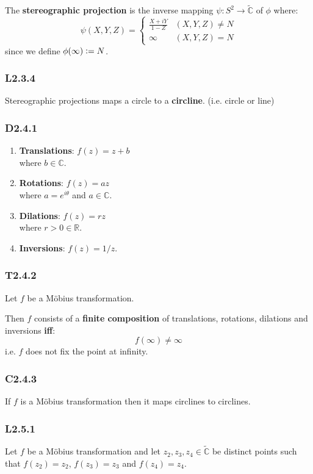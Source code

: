 \documentclass{article}
\newcommand{\deq}{\vcentcolon=}
\begin{document}
\begin{multicols*}{3}
The \textbf{stereographic projection} is the inverse mapping
$\psi:S^2\rightarrow\widetilde{\mathbb{C}}$ of $\phi$ where:
$$\psi(X,Y,Z)=\left\{\begin{array}{ll}
    \frac{X+iY}{1-Z} & (X,Y,Z)\neq N \\
    \infty & (X,Y,Z)=N
\end{array}\right.$$
since we define $\phi(\infty)\deq N$.

\subsubsection*{L2.3.4}
Stereographic projections maps a circle
to a \textbf{circline}. (i.e. circle or line)

\subsubsection*{D2.4.1}
\begin{enumerate}
    \item \textbf{Translations}: $f(z)=z+b$ \\
    where $b\in\mathbb{C}$.

    \item \textbf{Rotations}: $f(z)=az$ \\
    where $a=e^{i\theta}$ and $a\in\mathbb{C}$.

    \item \textbf{Dilations}: $f(z)=rz$ \\
    where $r>0\in\mathbb{R}$.

    \item \textbf{Inversions}: $f(z)=1/z$.
\end{enumerate}

\subsubsection*{T2.4.2}
Let $f$ be a M\"obius transformation.

Then $f$ consists of a
\textbf{finite composition} of translations, rotations,
dilations and inversions \textbf{if{}f}:
$$f(\infty)\neq\infty$$
i.e. $f$ does not fix the point at infinity.

\subsubsection*{C2.4.3}
If $f$ is a M\"obius transformation then
it maps circlines to circlines.

\subsubsection*{L2.5.1}
Let $f$ be a M\"obius transformation and let
$z_2,z_3,z_4\in\widetilde{\mathbb{C}}$ be distinct points
such that $f(z_2)=z_2$, $f(z_3)=z_3$ and $f(z_4)=z_4$.


\end{multicols*}
\end{document}
